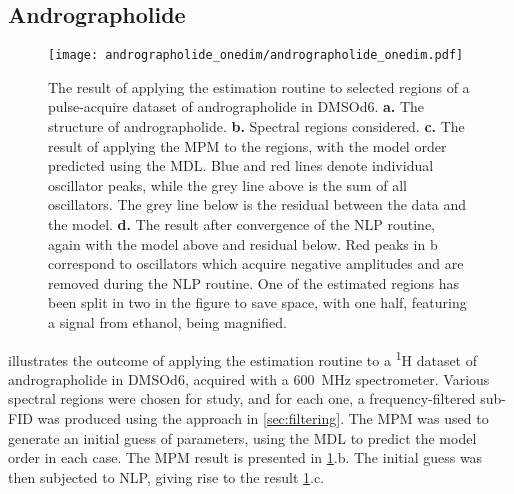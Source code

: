 \subsection{Andrographolide}
\label{subsec:andro}
\begin{figure}
    \centering
    \texttt{[image: andrographolide\_onedim/andrographolide\_onedim.pdf]}
    \caption[
        The result of applying the estimation routine to selected regions of a
        pulse-acquire dataset of andrographolide.
    ]{
        The result of applying the estimation routine to selected regions of a
        pulse-acquire dataset of andrographolide in \acs{DMSOd6}.
        \textbf{a.} The structure of andrographolide.
        \textbf{b.} Spectral regions considered.
        \textbf{c.} The result of applying the \acs{MPM} to the regions, with
        the model order predicted using the \acs{MDL}. Blue and red lines denote
        individual oscillator peaks, while the grey line above is the sum of all
        oscillators. The grey line below is the residual between the data and
        the model.
        \textbf{d.} The result after convergence of the \acs{NLP} routine, again
        with the model above and residual below.
        Red peaks in b correspond to oscillators which acquire negative
        amplitudes and are removed during the \acs{NLP} routine.
        One of the estimated regions has been split in two in the
        figure to save space, with one half, featuring a signal from ethanol,
        being magnified.
    }
    \label{fig:andro-onedim}
\end{figure}
 illustrates the outcome of applying the
estimation routine to a \textsuperscript{1}H dataset of
andrographolide in \acs{DMSOd6}, acquired with
a \qty{600}{\mega\hertz} spectrometer.
Various spectral regions were chosen for study, and for each one, a
frequency-filtered sub-\ac{FID} was produced using the approach in
\cref{sec:filtering}.
The \ac{MPM} was used to generate an initial guess of parameters, using the
\ac{MDL} to predict the model order in each case. The \ac{MPM} result
is presented in \cref{fig:andro-onedim}.b. The initial guess
was then subjected to \ac{NLP}, giving rise to the result
\cref{fig:andro-onedim}.c.

